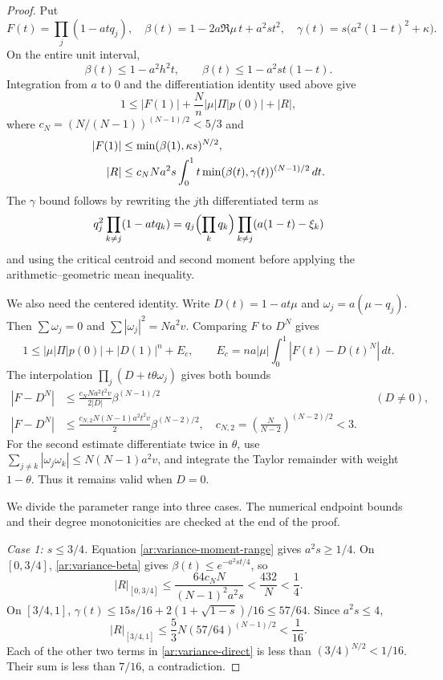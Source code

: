 \begin{proof}
Put
\[
 F(t)=\prod_j(1-atq_j),\quad
 \beta(t)=1-2a\Re\mu\,t+a^2st^2,\quad
 \gamma(t)=s\bigl(a^2(1-t)^2+\kappa\bigr).
\]
On the entire unit interval,
\begin{equation}\label{ar:variance-beta}
 \beta(t)\le1-a^2h^2t,
 \qquad \beta(t)\le1-a^2st(1-t).
\end{equation}
Integration from $a$ to $0$ and the differentiation identity used above
give
\begin{equation}\label{ar:variance-direct}
 1\le|F(1)|+\frac Nn|\mu|\Pi|p(0)|+|R|,
\end{equation}
where $c_N=(N/(N-1))^{(N-1)/2}<5/3$ and
\begin{align}
 |F(1)|&\le\min(\beta(1),\kappa s)^{N/2},\notag\\
 |R|&\le c_NNa^2s\int_0^1t\min(\beta(t),\gamma(t))^{(N-1)/2}\,dt.
 \label{ar:variance-remainder}
\end{align}
The $\gamma$ bound follows by rewriting the $j$th differentiated term
as
\[
 q_j^2\prod_{k\ne j}(1-atq_k)
 =q_j\Bigl(\prod_kq_k\Bigr)
       \prod_{k\ne j}(a(1-t)-\xi_k)
\]
and using the critical centroid and second moment before applying the
arithmetic--geometric mean inequality.

We also need the centered identity. Write $D(t)=1-at\mu$ and
$\omega_j=a(\mu-q_j)$. Then $\sum\omega_j=0$ and
$\sum|\omega_j|^2=Na^2v$. Comparing $F$ to $D^N$ gives
\begin{equation}\label{ar:variance-centered}
 1\le |\mu|\Pi|p(0)|+|D(1)|^n+E_c,
 \qquad E_c=na|\mu|\int_0^1|F(t)-D(t)^N|\,dt.
\end{equation}
The interpolation $\prod_j(D+t\theta\omega_j)$ gives both bounds
\begin{align}
 |F-D^N|&\le\frac{c_NNa^2t^2v}{2|D|}\beta^{(N-1)/2}
                  &&(D\ne0),\label{ar:center-first}\\
 |F-D^N|&\le\frac{c_{N,2}N(N-1)a^2t^2v}{2}\beta^{(N-2)/2},
 \quad c_{N,2}=\left(\frac N{N-2}\right)^{(N-2)/2}<3.
 \label{ar:center-second}
\end{align}
For the second estimate differentiate twice in $\theta$, use
$\sum_{j\ne k}|\omega_j\omega_k|\le N(N-1)a^2v$, and integrate
the Taylor remainder with weight $1-\theta$. Thus it remains valid
when $D=0$.

We divide the parameter range into three cases. The numerical endpoint
bounds and their degree monotonicities are checked at the end of the proof.

\smallskip
\noindent\emph{Case 1: $s\le3/4$.}
Equation \eqref{ar:variance-moment-range} gives $a^2s\ge1/4$.
On $[0,3/4]$, \eqref{ar:variance-beta} gives
$\beta(t)\le e^{-a^2st/4}$, so
\[
 |R|_{[0,3/4]}\le\frac{64c_NN}{(N-1)^2a^2s}
 <\frac{432}{N}<\frac14.
\]
On $[3/4,1]$,
$\gamma(t)\le15s/16+2(1+\sqrt{1-s})/16\le57/64$.
Since $a^2s\le4$,
\[
 |R|_{[3/4,1]}\le\frac53N(57/64)^{(N-1)/2}
 <\frac1{16}.
\]
Each of the other two terms in \eqref{ar:variance-direct} is less than
$(3/4)^{N/2}<1/16$. Their sum is less than $7/16$, a contradiction.


\end{proof}
